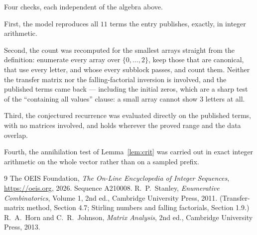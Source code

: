 \documentclass[11pt,a4paper]{article}
\theoremstyle{plain}
\theoremstyle{definition}
\begin{document}
Four checks, each independent of the algebra above.

First, the model reproduces all $11$ terms the entry publishes, exactly, in integer
arithmetic.

Second, the count was recomputed for the smallest arrays straight from the definition:
enumerate every array over $\{0,\dots,2\}$, keep those that are canonical, that use every
letter, and whose every subblock passes, and count them. Neither the transfer matrix nor the
falling-factorial inversion is involved, and the published terms came back --- including the
initial zeros, which are a sharp test of the ``containing all values'' clause: a small array
cannot show $3$ letters at all.

Third, the conjectured recurrence was evaluated directly on the published terms, with no
matrices involved, and holds wherever the proved range and the data overlap.

Fourth, the annihilation test of Lemma~\ref{lem:crit} was carried out in exact integer
arithmetic on the whole vector rather than on a sampled prefix.

\begin{thebibliography}{9}
 The OEIS Foundation, \emph{The On-Line Encyclopedia of Integer
Sequences}, \url{https://oeis.org}, 2026. Sequence A210008.
 R.~P.~Stanley, \emph{Enumerative Combinatorics}, Volume 1, 2nd ed.,
Cambridge University Press, 2011. (Transfer-matrix method, Section 4.7; Stirling numbers and
falling factorials, Section 1.9.)
 R.~A.~Horn and C.~R.~Johnson, \emph{Matrix Analysis}, 2nd ed., Cambridge
University Press, 2013.
\end{thebibliography}
\end{document}

